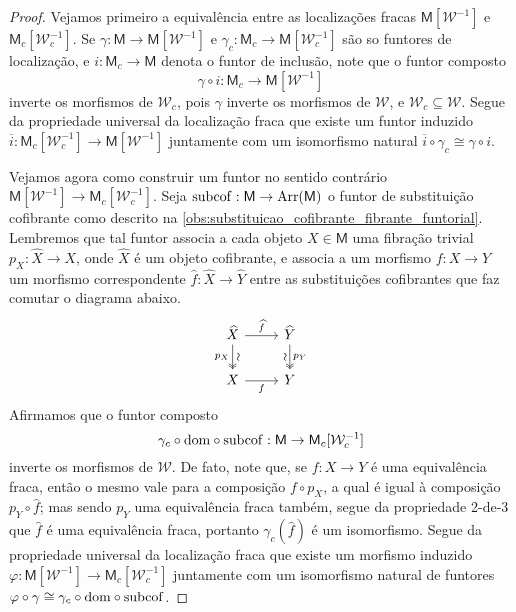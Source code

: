 \begin{proof}
  Vejamos primeiro a equivalência entre as localizações fracas $\mathsf{M}[\mathcal{W}^{-1}]$ e $\mathsf{M}_{c}[\mathcal{W}_{c}^{-1}]$.
  Se $\gamma: \mathsf{M} \to \mathsf{M}[\mathcal{W}^{-1}]$ e $\gamma_{c}: \mathsf{M}_{c} \to \mathsf{M}[\mathcal{W}_{c}^{-1}]$ são so funtores de localização, e $i: \mathsf{M}_{c} \to \mathsf{M}$ denota o funtor de inclusão, note que o funtor composto
  \begin{displaymath}
    \gamma \circ i: \mathsf{M}_{c} \to \mathsf{M}[\mathcal{W}^{-1}]
  \end{displaymath}
  inverte os morfismos de $\mathcal{W}_{c}$, pois $\gamma$ inverte os morfismos de $\mathcal{W}$, e $\mathcal{W}_{c} \subseteq \mathcal{W}$.
  Segue da propriedade universal da localização fraca que existe um funtor induzido $\overline{i}: \mathsf{M}_{c}[\mathcal{W}_{c}^{-1}] \to \mathsf{M}[\mathcal{W}^{-1}]$ juntamente com um isomorfismo natural $\overline{i} \circ \gamma_{c} \cong \gamma \circ i$.

  Vejamos agora como construir um funtor no sentido contrário $\mathsf{M}[\mathcal{W}^{-1}] \to \mathsf{M}_{c}[\mathcal{W}_{c}^{-1}]$.
  Seja $\mathrm{subcof}: \mathsf{M} \to \mathrm{Arr}(\mathsf{M})$ o funtor de substituição cofibrante como descrito na \cref{obs:substituicao_cofibrante_fibrante_funtorial}.
  Lembremos que tal funtor associa a cada objeto $X \in \mathsf{M}$ uma fibração trivial $p_{X}: \widehat{X} \to X$, onde $\widehat{X}$ é um objeto cofibrante, e associa a um morfismo $f: X \to Y$ um morfismo correspondente $\widehat{f}: \widehat{X} \to \widehat{Y}$ entre as substituições cofibrantes que faz comutar o diagrama abaixo.
  \begin{displaymath}
    \begin{tikzcd}
      \widehat{X}
      \arrow[r, "\widehat{f}"]
      \arrow[d, two heads, "p_{X}" {swap}, "\sim" {sloped}]
      & \widehat{Y}
      \arrow[d, two heads, "p_{Y}", "\sim" {swap,sloped}]
      \\ X
      \arrow[r, "f" swap]
      & Y
    \end{tikzcd}
  \end{displaymath}
  Afirmamos que o funtor composto
  \begin{displaymath}
    \gamma_{c} \circ \mathrm{dom} \circ \mathrm{subcof}: \mathsf{M} \to \mathsf{M}_{c}[\mathcal{W}_{c}^{-1}]
  \end{displaymath}
  inverte os morfismos de $\mathcal{W}$.
  De fato, note que, se $f: X \to Y$ é uma equivalência fraca, então o mesmo vale para a composição $f \circ p_{X}$, a qual é igual à composição $p_{Y} \circ \widehat{f}$; mas sendo $p_{Y}$ uma equivalência fraca também, segue da propriedade 2-de-3 que $\widehat{f}$ é uma equivalência fraca, portanto $\gamma_{c}(\widehat{f})$ é um isomorfismo.
  Segue da propriedade universal da localização fraca que existe um morfismo induzido $\varphi: \mathsf{M}[\mathcal{W}^{-1}] \to \mathsf{M}_{c}[\mathcal{W}_{c}^{-1}]$ juntamente com um isomorfismo natural de funtores $\varphi \circ \gamma \cong \gamma_{c} \circ \mathrm{dom} \circ \mathrm{subcof}$.


\end{proof}
